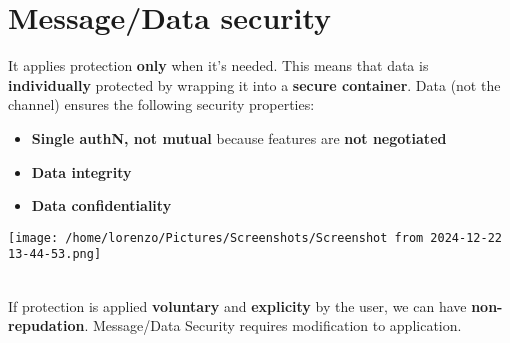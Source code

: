 \section{Message/Data security}
\begin{minipage}{0.6\textwidth}
It applies protection \textbf{only} when it's needed. This means that data is \textbf{individually} protected by wrapping it into a \textbf{secure container}. Data (not the channel) ensures the following security properties:
\begin{itemize}
    \item \textbf{Single authN, not mutual} because features are \textbf{not negotiated}
    \item \textbf{Data integrity}
    \item \textbf{Data confidentiality}
\end{itemize}
\end{minipage} 
\hspace{0.5cm}
\begin{minipage}{0.4\textwidth}
    \centering
    \texttt{[image: /home/lorenzo/Pictures/Screenshots/Screenshot from 2024-12-22 13-44-53.png]}
\end{minipage}
\noindent
\newline
\\If protection is applied \textbf{voluntary} and \textbf{explicity} by the user, we can have \textbf{non-repudation}. Message/Data Security requires modification to application.
\newpage
